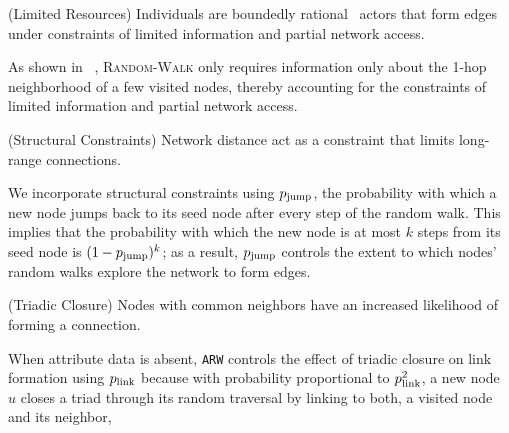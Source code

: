 \begin{ph}
	(Limited Resources) Individuals are boundedly rational~\cite{simon1972theories,gigerenzer1996reasoning,lipman1995information}
	actors that form edges under constraints of limited information and partial network access.
\end{ph}
As shown in ~, \textsc{Random-Walk} only requires information only about the
1-hop neighborhood of a few visited nodes, thereby accounting for the constraints of limited information and partial network access.

\begin{ph}
	(Structural Constraints) Network distance
	act as a constraint that limits long-range connections.  \cite{35626}
\end{ph}

We incorporate structural constraints using $p_{\scriptsize\mbox{jump}}$, the probability with
which a new node jumps back to its seed node after every step of the random walk. This implies
that the probability with which the new node is at most $k$ steps from its seed node is $(1-p_{\scriptsize\mbox{jump}})^k$;
as a result, $p_{\scriptsize\mbox{jump}}$ controls the extent to which nodes' random walks explore the network to form edges.

\begin{ph}
	(Triadic Closure) Nodes with common neighbors have an
	increased likelihood of forming a connection. \cite{simmel1950sociology}
\end{ph}

When attribute data is absent, \texttt{ARW} controls
the effect of triadic closure on link formation using $p_{\scriptsize\mbox{link}}$ because
with probability proportional to $p_{\scriptsize\mbox{link}}^2$,
a new node $u$ closes a triad through its random traversal by linking to both, a visited node
and its neighbor,

